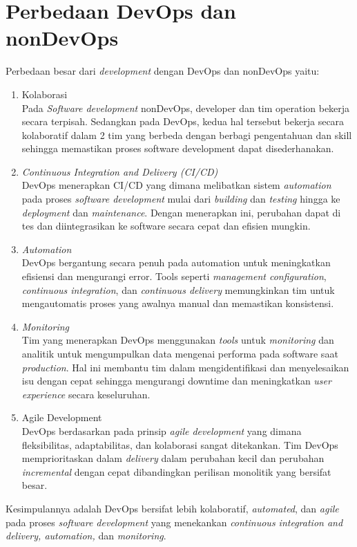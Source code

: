 \section{Perbedaan DevOps dan nonDevOps}
Perbedaan besar dari \textit{development} dengan DevOps dan nonDevOps yaitu:
	\begin{enumerate}
		\item Kolaborasi
		\\Pada \textit{Software development} nonDevOps, developer dan tim operation bekerja secara terpisah. Sedangkan pada DevOps, kedua hal tersebut bekerja secara kolaboratif dalam 2 tim yang berbeda dengan berbagi pengentahuan dan skill sehingga memastikan proses software development dapat disederhanakan.
		
		\item \textit{Continuous Integration and Delivery (CI/CD)}
		\\DevOps menerapkan CI/CD yang dimana melibatkan sistem \textit{automation} pada proses \textit{software development} mulai dari \textit{building} dan \textit{testing} hingga ke \textit{deployment} dan \textit{maintenance}. Dengan menerapkan ini, perubahan dapat di tes dan diintegrasikan ke software secara cepat dan efisien mungkin.
		\item \textit{Automation}
		\\DevOps bergantung secara penuh pada automation untuk meningkatkan efisiensi dan mengurangi error. Tools seperti \textit{management configuration}, \textit{continuous integration}, dan \textit{continuous delivery} memungkinkan tim untuk mengautomatis proses yang awalnya manual dan memastikan konsistensi.
		\item \textit{Monitoring}
		\\Tim yang menerapkan DevOps menggunakan \textit{tools} untuk \textit{monitoring} dan analitik untuk mengumpulkan data mengenai performa pada software saat \textit{production}. Hal ini membantu tim dalam mengidentifikasi dan menyelesaikan isu dengan cepat sehingga mengurangi downtime dan meningkatkan \textit{user experience} secara keseluruhan.
		\item Agile Development
		\\DevOps berdasarkan pada prinsip \textit{agile development} yang dimana fleksibilitas, adaptabilitas, dan kolaborasi sangat ditekankan. Tim DevOps memprioritaskan dalam \textit{delivery} dalam perubahan kecil dan perubahan \textit{incremental} dengan cepat dibandingkan perilisan monolitik yang bersifat besar.
	\end{enumerate}
	Kesimpulannya adalah DevOps bersifat lebih kolaboratif, \textit{automated}, dan \textit{agile} pada proses\textit{ software development} yang menekankan \textit{continuous integration and delivery, automation, }dan \textit{monitoring}.

